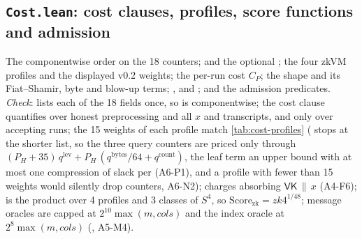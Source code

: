 \subsection{\texttt{Cost.lean}: cost clauses, profiles, score functions and admission}\label{subsec:app-cost}

The componentwise order on the 18 counters;  and the optional
; the four zkVM profiles and the displayed v0.2 weights; the per-run
cost $C_P$; the shape  and its Fiat--Shamir, byte and blow-up terms;
,  and ; and the admission predicates.
\emph{Check}:  lists each of the 18 fields once, so  is componentwise;
the cost clause quantifies over honest preprocessing and all $x$ and transcripts, and only over
accepting runs; the 15 weights of each profile match \cref{tab:cost-profiles} ( stops at
the shorter list, so the three query counters are priced only through
$(P_H+35)\,q^{\mathrm{lev}}+P_H\,(q^{\mathrm{bytes}}/64+q^{\mathrm{count}})$, the leaf term an upper
bound with at most one compression of slack per  (A6-P1), and a profile with fewer than
15 weights would silently drop counters, A6-N2);  charges absorbing
$\mathsf{VK}\,\|\,x$ (A4-F6);  is the product over 4 profiles and 3 classes of $S^4$,
so $\mathrm{Score}_{\mathrm{zk}}=\mathit{zk4}^{1/48}$; message oracles are capped at
$2^{10}\max(m,\mathit{cols})$ and the index oracle at $2^{8}\max(m,\mathit{cols})$
(, A5-M4).

